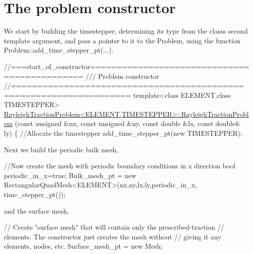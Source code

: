 

\hypertarget{index_constructor}{}\section{The problem constructor}\label{index_constructor}
We start by building the timestepper, determining its type from the class\textquotesingle{}s second template argument, and pass a pointer to it to the Problem, using the function {\ttfamily Problem\+::add\+\_\+time\+\_\+stepper\+\_\+pt}(...).


\begin{DoxyCodeInclude}
\textcolor{comment}{//===start\_of\_constructor=============================================}
\textcolor{comment}{/// Problem constructor}
\textcolor{comment}{}\textcolor{comment}{//====================================================================}
\textcolor{keyword}{template}<\textcolor{keyword}{class} ELEMENT,\textcolor{keyword}{class} TIMESTEPPER>
\hyperlink{classRayleighTractionProblem_a6be21517d8294957f768184a2d51844a}{RayleighTractionProblem<ELEMENT,TIMESTEPPER>::RayleighTractionProblem}
(\textcolor{keyword}{const} \textcolor{keywordtype}{unsigned} &nx, \textcolor{keyword}{const} \textcolor{keywordtype}{unsigned} &ny,
 \textcolor{keyword}{const} \textcolor{keywordtype}{double} &lx, \textcolor{keyword}{const} \textcolor{keywordtype}{double}& ly)
\{
 \textcolor{comment}{//Allocate the timestepper}
 add\_time\_stepper\_pt(\textcolor{keyword}{new} TIMESTEPPER); 

\end{DoxyCodeInclude}


Next we build the periodic bulk mesh,


\begin{DoxyCodeInclude}

 \textcolor{comment}{//Now create the mesh with periodic boundary conditions in x direction}
 \textcolor{keywordtype}{bool} periodic\_in\_x=\textcolor{keyword}{true};
 Bulk\_mesh\_pt = 
  \textcolor{keyword}{new} RectangularQuadMesh<ELEMENT>(nx,ny,lx,ly,periodic\_in\_x,
                                   time\_stepper\_pt());

\end{DoxyCodeInclude}


and the surface mesh,


\begin{DoxyCodeInclude}

 \textcolor{comment}{// Create "surface mesh" that will contain only the prescribed-traction }
 \textcolor{comment}{// elements. The constructor just creates the mesh without}
 \textcolor{comment}{// giving it any elements, nodes, etc.}
 Surface\_mesh\_pt = \textcolor{keyword}{new} Mesh;

\end{DoxyCodeInclude}


